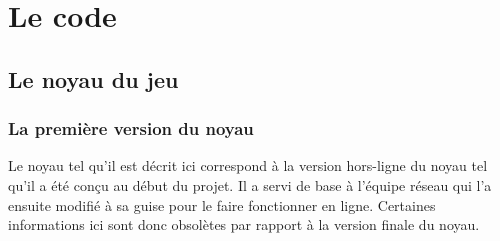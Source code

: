 \documentclass[a4paper,11pt]{article}
\begin{document}
\newpage


\section{Le code}

\subsection{Le noyau du jeu}

\subsubsection{La première version du noyau}

    Le noyau tel qu’il est décrit ici correspond à la version hors-ligne du noyau tel qu’il a été conçu au début du projet. Il a servi de base à l’équipe réseau qui l’a ensuite modifié à sa guise pour le faire fonctionner en ligne. Certaines informations ici sont donc obsolètes par rapport à la version finale du noyau. \\
\end{document}
